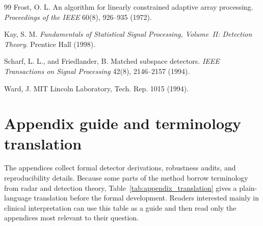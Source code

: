 \documentclass[11pt]{article}
\newif\ifPAPERONLY
\begin{document}
\begin{thebibliography}{99}
Frost, O. L.
\newblock An algorithm for linearly constrained adaptive array processing.
\newblock \emph{Proceedings of the IEEE} 60(8), 926--935 (1972).

Kay, S. M.
\newblock \emph{Fundamentals of Statistical Signal Processing, Volume~II: Detection Theory}.
\newblock Prentice Hall (1998).

Scharf, L. L., and Friedlander, B.
\newblock Matched subspace detectors.
\newblock \emph{IEEE Transactions on Signal Processing} 42(8), 2146--2157 (1994).

Ward, J.
\newblock MIT Lincoln Laboratory, Tech. Rep. 1015 (1994).

\end{thebibliography}

\ifPAPERONLY\else
\appendix

\section{Appendix guide and terminology translation}
\label{app:appendix-guide}

The appendices collect formal detector derivations, robustness audits, and reproducibility details. Because some parts of the method borrow terminology from radar and detection theory, Table~\ref{tab:appendix_translation} gives a plain-language translation before the formal development. Readers interested mainly in clinical interpretation can use this table as a guide and then read only the appendices most relevant to their question.
\end{document}
